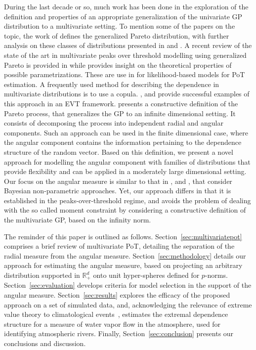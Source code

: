 During the last decade or so, much work has been done in the exploration of the 
    definition and properties of an appropriate generalization of the univariate 
    GP distribution to a multivariate setting.  To mention some of the papers on 
    the topic, the work of \citep{rootzen2006} defines the generalized Pareto 
    distribution, with further analysis on these classes of distributions 
    presented in \cite{falk2008} and \cite{michel2008}.  A recent review of the 
    state of the art in multivariate peaks over threshold modelling using 
    generalized Pareto is provided in \cite{rootzen2018} while \cite{RoSeWa2018a} 
    provides insight on the theoretical properties of possible parametrizations. 
    These are use in \cite{KiRoSeWa2019} for likelihood-based models for PoT 
    estimation. A frequently used method for describing the dependence in 
    multivariate distributions is to use a copula. \cite{renard2007}, and 
    \cite{falk2019} provide successful  examples of this approach in an EVT 
    framework. \cite{ferreira2014} presents a constructive definition of the 
    Pareto process, that generalizes the GP to an infinite dimensional setting. It 
    consists of decomposing the process into independent radial and angular 
    components. Such an approach can be used in the finite dimensional case, where 
    the angular component contains the information pertaining to the dependence 
    structure of the random vector. Based on this definition, we present a novel 
    approach for modelling  the angular component with families of distributions 
    that provide flexibility and can be applied in a moderately large dimensional 
    setting.  Our focus on the angular measure is similar to that in \cite{boldi2007},
    \cite{SaNa2014} and \cite{HaCaCh2017}, that consider Bayesian non-parametric 
    approaches. Yet, our approach differs in that it is established in the 
    peaks-over-threshold regime, and avoids the problem of dealing with the so 
    called moment constraint by considering a constructive definition of the 
    multivariate GP, based on the infinity norm. 
  
The reminder of this paper is outlined as follows. 
    Section~\ref{sec:multivariatepot} comprises a brief review of multivariate PoT, 
      detailing the separation of the radial measure from the angular measure.
    Section~\ref{sec:methodology} details our approach for estimating the angular 
      measure, based on projecting an arbitrary distribution supported in ${\mathbb R}_+^d$ 
      onto unit hyper-spheres defined for $p$-norms. 
    Section~\ref{sec:evaluation} develops criteria for model selection in the support 
      of the angular measure.  
    Section~\ref{sec:results} explores the efficacy of the proposed approach on a set 
      of simulated data, and, acknowledging the relevance of extreme value theory to 
      climatological events~\citep{jentsch2007,vousdoukas2018,li2019}, estimates the 
      extremal dependence structure for a measure of water vapor flow in the atmosphere, 
      used for identifying atmospheric rivers.  
    Finally, Section~\ref{sec:conclusion} presents our conclusions and discussion.

